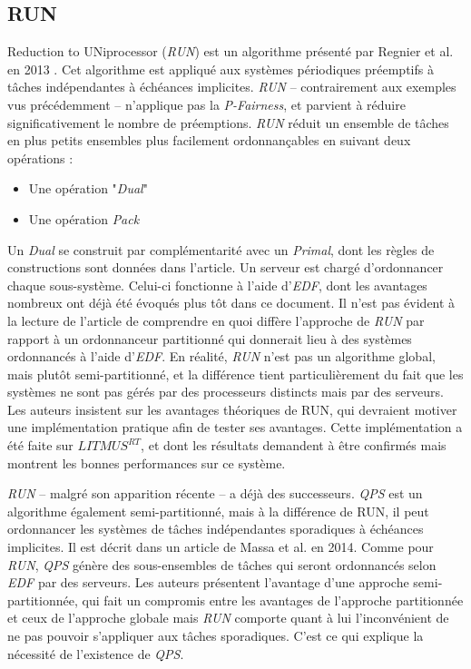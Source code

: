\documentclass[11pt,a4paper,oneside]{report}
\begin{document}
	\subsection{RUN}
	Reduction to UNiprocessor (\textit{RUN}) est un algorithme présenté par Regnier et al. en 2013 \cite{regnier_multiprocessor_2013}. 
	Cet algorithme est appliqué aux systèmes périodiques préemptifs à tâches indépendantes à 
	échéances implicites. \textit{RUN} -- contrairement aux exemples vus précédemment -- n'applique pas 
	la \textit{P-Fairness}, et parvient à réduire significativement le nombre de préemptions. 
	\textit{RUN} réduit un ensemble de tâches en plus petits ensembles plus facilement ordonnançables 
	en suivant deux opérations :\medskip
	\begin{itemize}
		\item Une opération "\textit{Dual}"
		\item Une opération \textit{Pack}
	\end{itemize}
	Un \textit{Dual} se construit par complémentarité avec un \textit{Primal}, dont les règles de constructions sont 
	données dans l'article.
	Un serveur est chargé d'ordonnancer chaque sous-système. Celui-ci fonctionne à l'aide 
	d'\textit{EDF}, dont les avantages nombreux ont déjà été évoqués plus tôt dans ce document. 
	Il n'est pas évident à la lecture de l'article de comprendre en quoi 
	diffère l'approche de \textit{RUN} par rapport à un ordonnanceur 
	partitionné qui donnerait lieu à des systèmes ordonnancés à l'aide d'\textit{EDF}. 
	En réalité, \textit{RUN} n'est pas un algorithme global, mais plutôt 
	semi-partitionné, et la différence tient particulièrement du fait que les systèmes ne sont pas 
	gérés par des processeurs distincts mais par des serveurs.  
	Les auteurs insistent sur les avantages théoriques de RUN, qui devraient motiver une implémentation 
	pratique afin de tester ses avantages. Cette implémentation a été faite 
	\cite{compagnin_putting_2014} sur $LITMUS^{RT}$, et dont les résultats demandent à 
	être confirmés mais montrent les bonnes performances sur ce système.\medskip
	
	\textit{RUN} -- malgré son apparition récente -- a déjà des successeurs. \textit{QPS} est un algorithme 
	également semi-partitionné, mais à la différence de RUN, il peut ordonnancer les systèmes 
	de tâches indépendantes sporadiques à échéances implicites. 
	Il est décrit dans un article de Massa et al. \cite{massa_outstanding_2014} en 2014. 
	Comme pour \textit{RUN}, \textit{QPS} génère des sous-ensembles de tâches qui seront ordonnancés 
	selon \textit{EDF} par des serveurs. Les auteurs présentent l'avantage d'une approche semi-partitionnée, 
	qui fait un compromis entre les avantages de l'approche partitionnée et ceux de l'approche globale 
	mais \textit{RUN} comporte quant à lui l'inconvénient de ne pas pouvoir s'appliquer aux tâches sporadiques. C'est ce qui explique la nécessité de l'existence de \textit{QPS}.
	
\end{document}
